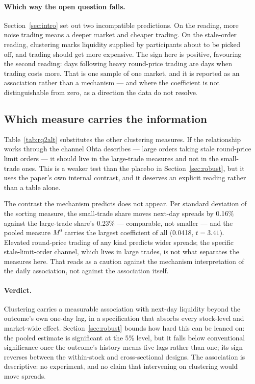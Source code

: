\paragraph{Which way the open question falls.}
Section~\ref{sec:intro} set out two incompatible predictions. On the
\textcite{Kyle1985} reading, more noise trading means a deeper market and
cheaper trading. On the stale-order reading, clustering marks liquidity supplied
by participants about to be picked off, and trading should get more expensive.
The sign here is positive, favouring the second reading: days following heavy round-price trading are days when trading costs more. That is one sample of one market, and it is
reported as an association rather than a mechanism --- and where the coefficient
is not distinguishable from zero, as a direction the data do not resolve.

\subsection{Which measure carries the information}



Table~\ref{tab:rq2alt} substitutes the other clustering measures. If the
relationship works through the channel Ohta describes --- large orders taking
stale round-price limit orders --- it should live in the large-trade measures and
not in the small-trade ones. This is a weaker test than
the placebo in Section~\ref{sec:robust}, but it uses the paper's own internal
contrast, and it deserves an explicit reading rather than a table alone.

The contrast the mechanism predicts does not appear. Per standard deviation of the sorting measure, the small-trade share moves next-day spreads by 0.16\% against the large-trade share's 0.23\% --- comparable, not smaller --- and the pooled measure $M^{0}$ carries the largest coefficient of all (0.0418, $t=3.41$). Elevated round-price trading of any kind predicts wider spreads; the specific stale-limit-order channel, which lives in large trades, is not what separates the measures here. That reads as a caution against the mechanism interpretation of the daily association, not against the association itself.

\paragraph{Verdict.}
Clustering carries a measurable association with next-day liquidity beyond the outcome's own one-day lag, in a specification that absorbs every stock-level and market-wide effect. Section~\ref{sec:robust} bounds how hard this can be leaned on: the pooled estimate is significant at the 5\% level, but it falls below conventional significance once the outcome's history means five lags rather than one; its sign reverses between the within-stock and cross-sectional designs. The association is descriptive: no experiment, and no claim that intervening on clustering would move spreads.

